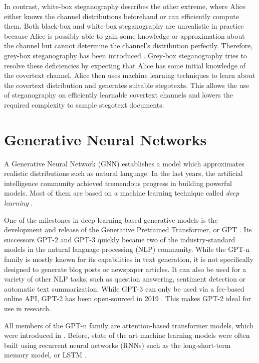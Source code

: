 In contrast, white-box steganography describes the other extreme, where Alice either knows the channel distributions beforehand or can efficiently compute them.
Both black-box and white-box steganography are unrealistic in practice because Alice is possibly able to gain some knowledge or approximation about the channel but cannot determine the channel's distribution perfectly.
Therefore, grey-box steganography has been introduced \cite{LRW2013}.
Grey-box steganography tries to resolve these deficiencies by expecting that Alice has some initial knowledge of the covertext channel.
Alice then uses machine learning techniques to learn about the covertext distribution and generates suitable stegotexts.
This allows the use of steganography on efficiently learnable covertext channels and lowers the required complexity to sample stegotext documents.

\section{Generative Neural Networks}
\label{sec:generative-neural-networks}

A Generative Neural Network (GNN) establishes a model which approximates realistic distributions such as natural language.
In the last years, the artificial intelligence community achieved tremendous progress in building powerful models.
Most of them are based on a machine learning technique called \emph{deep learning} \cite{DeepLearning2015}.

One of the milestones in deep learning based generative models is the development and release of the Generative Pretrained Transformer, or GPT \cite{OpenAI2018}.
Its successors GPT-2 \cite{OpenAI2019} and GPT-3 \cite{OpenAI2020} quickly became two of the industry-standard models in the natural language processing (NLP) community.
While the GPT-n family is mostly known for its capabilities in text generation, it is not specifically designed to generate blog posts or newspaper articles.
It can also be used for a variety of other NLP tasks, such as question answering, sentiment detection or automatic text summarization.
While GPT-3 can only be used via a fee-based online API, GPT-2 has been open-sourced in 2019 \cite{GPTReleasePlan2019}.
This makes GPT-2 ideal for use in research.

All members of the GPT-n family are attention-based transformer models, which were introduced in \cite{Vaswani2017}.
Before, state of the art machine learning models were often built using recurrent neural networks (RNNs) such as the long-short-term memory model, or LSTM \cite{Hochreiter1997}.

